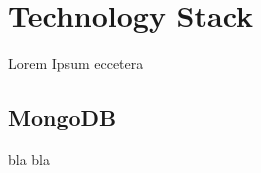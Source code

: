 \chapter{Technology Stack}

Lorem Ipsum eccetera

    \section{MongoDB}

        bla bla \cite{etichetta1}